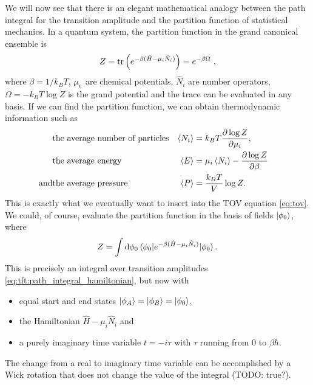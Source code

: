 We will now see that there is an elegant mathematical analogy between the path integral for the transition amplitude and the partition function of statistical mechanics.
In a quantum system, the partition function in the grand canonical ensemble is
\begin{equation}
	Z = \trace \left( e^{-\beta (\hat{H} - \mu_i \hat{N}_i)} \right) = e^{-\beta \Omega} ,
\end{equation}
where $\beta = 1 / k_B T$, $\mu_i$ are chemical potentials, $\hat{N}_i$ are number operators, $\Omega = -k_B T \log{Z}$ is the grand potential and the trace can be evaluated in any basis.
If we can find the partition function, we can obtain thermodynamic information such as \cite[chapter 5]{ref:jensoluf}
\begin{align}
	           & \text{the average number of particles} & \thermalavg{N_i} & = k_B T \pdv{\log{Z}}{\mu_i},                    & \\
	           & \text{the average energy}              & \thermalavg{E}   & = \mu_i \thermalavg{N_i} - \pdv{\log{Z}}{\beta}  & \\ %
	\text{and} & \text{the average pressure}            & \thermalavg{P}   & = \frac{k_B T}{V} \log{Z}.                       &    %
\end{align}
This is exactly what we eventually want to insert into the TOV equation \eqref{eq:tov}.
We could, of course, evaluate the partition function in the basis of fields $\ket{\phi_0}$, where
\begin{equation}
	Z = \int \mathop{}\!\mathrm{d} \phi_0 \braket{\phi_0 | e^{-\beta (\hat{H} - \mu_i \hat{N}_i)} | \phi_0} .
\end{equation}
This is precisely an integral over transition amplitudes \eqref{eq:tft:path_integral_hamiltonian}, but now with 
\begin{itemize}
\item equal start and end states $\ket{\phi_A} = \ket{\phi_B} = \ket{\phi_0}$, 
\item the Hamiltonian $\hat{H} - \mu_i \hat{N}_i$ and 
\item a purely imaginary time variable $t = -i \tau$ with $\tau$ running from $0$ to $\beta \hbar$.
\end{itemize}
The change from a real to imaginary time variable can be accomplished by a Wick rotation that does not change the value of the integral (TODO: true?).
